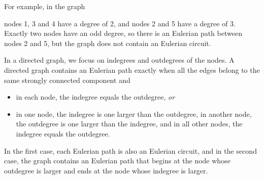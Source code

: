 \begin{samepage}
For example, in the graph
\begin{center}
\end{center}
\end{samepage}
nodes 1, 3 and 4 have a degree of 2,
and nodes 2 and 5 have a degree of 3.
Exactly two nodes have an odd degree,
so there is an Eulerian path between nodes 2 and 5,
but the graph does not contain an Eulerian circuit.

In a directed graph,
we focus on indegrees and outdegrees
of the nodes.
A directed graph contains an Eulerian path
exactly when all the edges belong to the same strongly
connected component and
\begin{itemize}
\item in each node, the indegree equals the outdegree, \emph{or}
\item in one node, the indegree is one larger than the outdegree,
in another node, the outdegree is one larger than the indegree,
and in all other nodes, the indegree equals the outdegree.
\end{itemize}

In the first case, each Eulerian path
is also an Eulerian circuit,
and in the second case, the graph contains an Eulerian path
that begins at the node whose outdegree is larger
and ends at the node whose indegree is larger.

